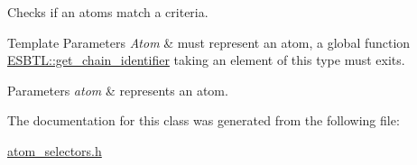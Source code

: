 Checks if an atoms match a criteria. 
\begin{DoxyTemplParams}{Template Parameters}
{\em Atom} & must represent an atom, a global function \hyperlink{namespaceESBTL_a77317a847ab3d5ed38cf42b4b7508539}{E\+S\+B\+T\+L\+::get\+\_\+chain\+\_\+identifier} taking an element of this type must exits. \\
\hline
\end{DoxyTemplParams}

\begin{DoxyParams}{Parameters}
{\em atom} & represents an atom. \\
\hline
\end{DoxyParams}


The documentation for this class was generated from the following file\+:\begin{DoxyCompactItemize}
\item 
\hyperlink{atom__selectors_8h}{atom\+\_\+selectors.\+h}\end{DoxyCompactItemize}
